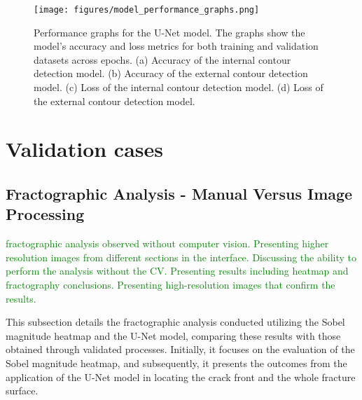\documentclass[preprint,12pt]{elsarticle}
\begin{document}
\begin{itemize}


\begin{figure}[bh!]
    \centering
    \begin{adjustbox}{max width=\linewidth, max height=\textheight}
        \texttt{[image: figures/model\_performance\_graphs.png]}
    \end{adjustbox}
    \caption{Performance graphs for the U-Net model. The graphs show the model's accuracy and loss metrics for both training and validation datasets across epochs. (a) Accuracy of the internal contour detection model. (b) Accuracy of the external contour detection model. (c) Loss of the internal contour detection model. (d) Loss of the external contour detection model.}
    \label{fig:model_performance_graphs}
\end{figure}








\section{Validation cases}
\label{Sec: Validation cases}

\subsection{Fractographic Analysis - Manual Versus Image Processing}
\label{Subsec: Experimental Results}
\textcolor{green}{fractographic analysis observed without computer vision. Presenting higher resolution images from different sections in the interface. Discussing the ability to perform the analysis without the CV. Presenting results including heatmap and fractography conclusions. Presenting high-resolution images that confirm the results.
}

This subsection details the fractographic analysis conducted utilizing the Sobel magnitude heatmap and the U-Net model, comparing these results with those obtained through validated processes.
Initially, it focuses on the evaluation of the Sobel magnitude heatmap, and subsequently, it presents the outcomes from the application of the U-Net model in locating the crack front and the whole fracture surface.


\end{itemize}
\end{document}
